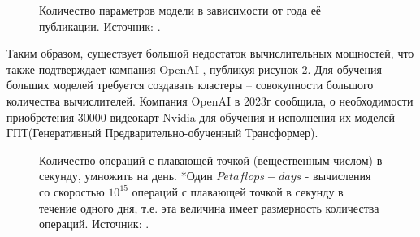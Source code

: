 \begin{figure}[h!]
	\caption{Количество параметров модели в зависимости от года её публикации. Источник: \cite{bernstein2021freely}.}
	\label{ris:ParametersANN}
\end{figure}
Таким образом, существует большой недостаток вычислительных мощностей, что также подтверждает компания OpenAI \cite{openai_website}, публикуя рисунок \ref{ris:OpenAI}. Для обучения больших моделей требуется создавать кластеры -- совокупности большого количества вычислителей. Компания OpenAI в 2023г сообщила, о необходимости приобретения $30000$ видеокарт Nvidia для обучения и исполнения их моделей ГПТ(Генеративный Предварительно-обученный Трансформер).
\begin{figure}[h!]
	\caption{
		Количество операций с плавающей точкой (вещественным числом) в секунду, умножить на день.
		*Один $Petaflops-days$ - вычисления со скоростью $10^{15}$ операций с плавающей точкой в секунду в течение одного дня, т.е. эта величина имеет размерность количества операций. Источник: \cite{openai_website}.}
	\label{ris:OpenAI}
\end{figure}
